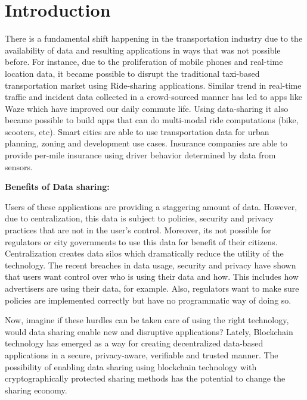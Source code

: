 \section{Introduction}\label{sec:intro}

There is a fundamental shift happening in the transportation industry due to the availability of data and resulting
applications in ways that was not possible before. For instance, due to the proliferation of mobile phones and real-time
location data, it became possible to disrupt the traditional taxi-based transportation market using Ride-sharing
applications. Similar trend in real-time traffic and incident data collected in a crowd-sourced manner has led to apps
like Waze which have improved our daily commute life. Using data-sharing it also became possible to build apps that can
do multi-modal ride computations (bike, scooters, etc). Smart cities are able to use transportation data for
urban planning, zoning and development use cases. Insurance companies are able to provide per-mile insurance using
driver behavior determined by data from sensors.

\noindent
{\bf \textsf Benefits of Data sharing:}


Users of these applications are providing a staggering amount of data. However, due to centralization, this data is
subject to policies, security and privacy practices that are not in the user's control. Moreover, its not possible for
regulators or city governments to use this data for benefit of their citizens. Centralization creates data silos which
dramatically reduce the utility of the technology. The recent breaches in data usage, security and privacy have shown
that users want control over who is using their data and how. This includes how advertisers are using their data, for
example. Also, regulators want to make sure policies are implemented correctly but have no programmatic way of doing so.

Now, imagine if these hurdles can be taken care of using the right technology, would data sharing enable new and
disruptive applications? Lately, Blockchain technology has emerged as a way for creating decentralized data-based
applications in a secure, privacy-aware, verifiable and trusted manner. The possibility of enabling data sharing using
blockchain technology with cryptographically protected sharing methods has the potential to change the sharing economy.

